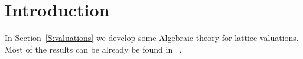 \documentclass[main.tex]{subfiles}
\begin{document}
\section{Introduction}
In Section~\ref{S:valuations}
we develop some Algebraic theory for lattice valuations.
Most of the results can be already be found in~%
.
\end{document}
